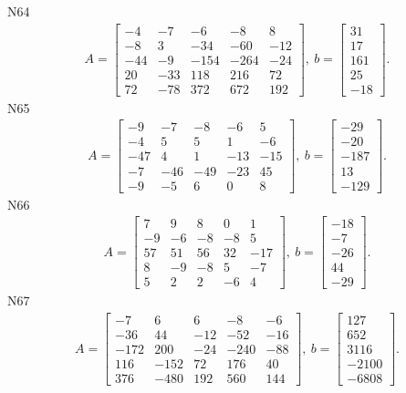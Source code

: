 \documentclass[11pt]{report}
\begin{document}
N64
\begin{align*}
 A = \left[\begin{matrix}-4 & -7 & -6 & -8 & 8\\-8 & 3 & -34 & -60 & -12\\-44 & -9 & -154 & -264 & -24\\20 & -33 & 118 & 216 & 72\\72 & -78 & 372 & 672 & 192\end{matrix}\right],
\ b = \left[\begin{matrix}31\\17\\161\\25\\-18\end{matrix}\right]. 
 \end{align*}
N65
\begin{align*}
 A = \left[\begin{matrix}-9 & -7 & -8 & -6 & 5\\-4 & 5 & 5 & 1 & -6\\-47 & 4 & 1 & -13 & -15\\-7 & -46 & -49 & -23 & 45\\-9 & -5 & 6 & 0 & 8\end{matrix}\right],
\ b = \left[\begin{matrix}-29\\-20\\-187\\13\\-129\end{matrix}\right]. 
 \end{align*}
N66
\begin{align*}
 A = \left[\begin{matrix}7 & 9 & 8 & 0 & 1\\-9 & -6 & -8 & -8 & 5\\57 & 51 & 56 & 32 & -17\\8 & -9 & -8 & 5 & -7\\5 & 2 & 2 & -6 & 4\end{matrix}\right],
\ b = \left[\begin{matrix}-18\\-7\\-26\\44\\-29\end{matrix}\right]. 
 \end{align*}
N67
\begin{align*}
 A = \left[\begin{matrix}-7 & 6 & 6 & -8 & -6\\-36 & 44 & -12 & -52 & -16\\-172 & 200 & -24 & -240 & -88\\116 & -152 & 72 & 176 & 40\\376 & -480 & 192 & 560 & 144\end{matrix}\right],
\ b = \left[\begin{matrix}127\\652\\3116\\-2100\\-6808\end{matrix}\right]. 
 \end{align*}
\end{document}
